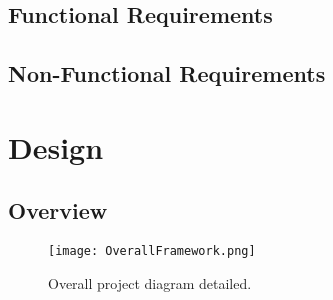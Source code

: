 \documentclass{l4proj}
\begin{document}
\section{Functional Requirements}
\section{Non-Functional Requirements}

\newpage
\chapter{Design}
\section{Overview}

\begin{figure}[!ht]
  \centering
    \texttt{[image: OverallFramework.png]}
	\caption{Overall project diagram detailed.}
\end{figure}
\end{document}

